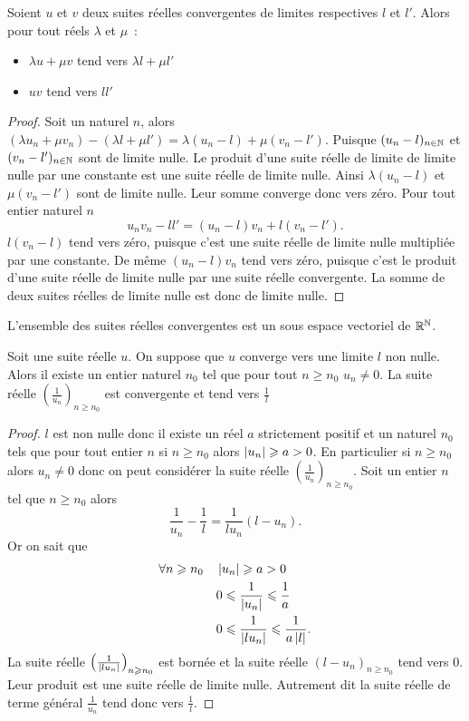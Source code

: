 \begin{prop}
  Soient $u$ et $v$ deux suites réelles convergentes de limites respectives $l$ et $l'$. Alors pour tout réels $\lambda$ et $\mu$~:
  \begin{itemize}
  \item $\lambda u + \mu v$ tend vers $\lambda l + \mu l'$
  \item $uv$ tend vers $ll'$
  \end{itemize}
\end{prop}
\begin{proof}
  Soit un naturel $n$, alors $(\lambda u_n + \mu v_n) - (\lambda l +\mu l')=\lambda(u_n-l)+\mu(v_n-l')$. Puisque $(u_n-l)_{n\in\mathbb{N}}$ et $(v_n-l')_{n\in\mathbb{N}}$ sont de limite nulle. Le produit d'une suite réelle de limite de limite nulle par une constante est une suite réelle de limite nulle. Ainsi $\lambda(u_n-l)$ et $\mu(v_n-l')$ sont de limite nulle. Leur somme converge donc vers zéro. Pour tout entier naturel $n$
\begin{equation}
  u_nv_n-ll'=(u_n-l)v_n+l(v_n-l').
\end{equation}
$l(v_n-l)$ tend vers zéro, puisque c'est une suite réelle de limite nulle multipliée par une constante. De même $(u_n-l)v_n$ tend vers zéro, puisque c'est le produit d'une suite réelle de limite nulle par une suite réelle convergente. La somme de deux suites réelles de limite nulle est donc de limite nulle.
\end{proof}
L'ensemble des suites réelles convergentes est un sous espace vectoriel de $\mathbb{R}^{\mathbb{N}}$.
\begin{prop}
  Soit une suite réelle $u$. On suppose que $u$ converge vers une limite $l$ non nulle. Alors il existe un entier naturel $n_0$ tel que pour tout $n \geqslant n_0$ $u_n \neq 0$. La suite réelle $\left(\frac{1}{u_n}\right)_{n \geqslant n_0}$ est convergente et tend vers $\frac{1}{l}$
\end{prop}
\begin{proof}
  $l$ est non nulle donc il existe un réel $a$ strictement positif et un naturel $n_0$ tels que pour tout entier $n$ si $n \geqslant n_0$ alors $\left\lvert u_n\right\rvert \geqslant a >0$. En particulier si $n \geqslant n_0$ alors $u_n \neq 0$ donc on peut considérer la suite réelle $\left(\frac{1}{u_n}\right)_{n \geqslant n_0}$. Soit un entier $n$ tel que $n \geqslant n_0$ alors
  \begin{equation}
    \frac{1}{u_n}-\frac{1}{l}=\frac{1}{lu_n}(l-u_n).
  \end{equation}
  Or on sait que
  \begin{align}
    \forall n \geqslant n_0 \quad &\left\lvert u_n\right\rvert \geqslant a > 0 \\
    & 0 \leqslant \frac{1}{\left\lvert u_n\right\rvert} \leqslant \frac{1}{a} \\
    & 0 \leqslant \frac{1}{\left\lvert lu_n\right\rvert} \leqslant \frac{1}{a\left\lvert l\right\rvert}.
  \end{align}
  La suite réelle $\left(\frac{1}{\left\lvert lu_n\right\rvert}\right)_{n \geqslant n_0}$ est bornée et la suite réelle $(l-u_n)_{n \geqslant n_0}$ tend vers 0. Leur produit est une suite réelle de limite nulle. Autrement dit la suite réelle de terme général $\frac{1}{u_n}$ tend donc vers $\frac{1}{l}$.
\end{proof}

